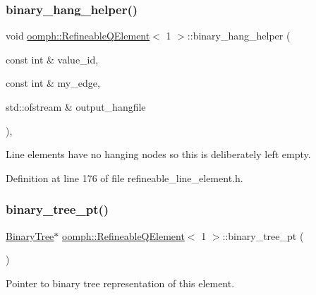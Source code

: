 \subsubsection{\texorpdfstring{binary\+\_\+hang\+\_\+helper()}{binary\_hang\_helper()}}
{\footnotesize\ttfamily void \hyperlink{classoomph_1_1RefineableQElement}{oomph\+::\+Refineable\+Q\+Element}$<$ 1 $>$\+::binary\+\_\+hang\+\_\+helper (\begin{DoxyParamCaption}\item[{const int \&}]{value\+\_\+id,  }\item[{const int \&}]{my\+\_\+edge,  }\item[{std\+::ofstream \&}]{output\+\_\+hangfile }\end{DoxyParamCaption})\hspace{0.3cm}{\ttfamily [inline]}, {\ttfamily [protected]}}



Line elements have no hanging nodes so this is deliberately left empty. 



Definition at line 176 of file refineable\+\_\+line\+\_\+element.\+h.

\mbox{\label{classoomph_1_1RefineableQElement_3_011_01_4_a7506b79e754b71cd1a33dfe8dedb5b52}} 
\subsubsection{\texorpdfstring{binary\+\_\+tree\+\_\+pt()}{binary\_tree\_pt()}\hspace{0.1cm}{\footnotesize\ttfamily [1/2]}}
{\footnotesize\ttfamily \hyperlink{classoomph_1_1BinaryTree}{Binary\+Tree}$\ast$ \hyperlink{classoomph_1_1RefineableQElement}{oomph\+::\+Refineable\+Q\+Element}$<$ 1 $>$\+::binary\+\_\+tree\+\_\+pt (\begin{DoxyParamCaption}{ }\end{DoxyParamCaption})\hspace{0.3cm}{\ttfamily [inline]}}



Pointer to binary tree representation of this element. 



